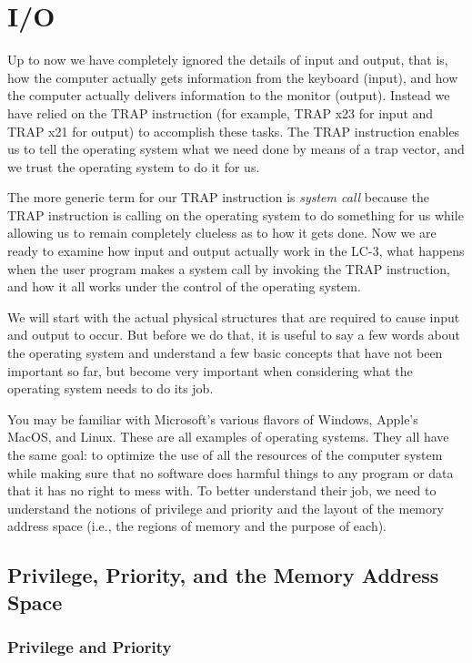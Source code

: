 \documentclass{patt}
\begin{document}
\chapter{I/O}
\label{chapt:os}

Up to now we have completely ignored the details of input and output,
that is, how the computer actually gets information from the keyboard (input),
and how the computer actually delivers information to the monitor (output).  
Instead we have relied on the TRAP instruction (for example, TRAP x23 for input 
and TRAP x21 for output) to accomplish these tasks.  The TRAP instruction
enables us to tell the operating system what we need done by means of a 
trap vector, and we trust the operating system to do it for us.

The more generic term for our TRAP instruction is {\em system call} because 
the TRAP instruction is calling on the operating system to do something for 
us while allowing us to remain completely clueless as to how it gets done.
Now we are ready to examine how input and output actually work in the LC-3, 
what happens when the user program makes a system call by invoking the TRAP 
instruction, and how it all works under the control of the operating system.  

We will start with the actual physical structures that are required to 
cause input and output to occur.  But before we do that, it is useful to
say a few words about the operating system and understand a few basic 
concepts that have not been important so far, but become very important 
when considering what the operating system needs to do its job.

You may be familiar with Microsoft's various flavors of Windows, 
Apple's MacOS, and Linux.  These are all examples of operating systems.  
They all have the same goal: to optimize the use of all the resources of 
the computer system while making sure that no software does harmful things 
to any program or data that it has no right to mess with.  To better
understand their job, we need to understand the notions of privilege and 
priority and the layout of the memory address space (i.e., the regions of 
memory and the purpose of each).  

\section{Privilege, Priority, and the Memory Address Space}
\subsection{Privilege and Priority}
\end{document}
